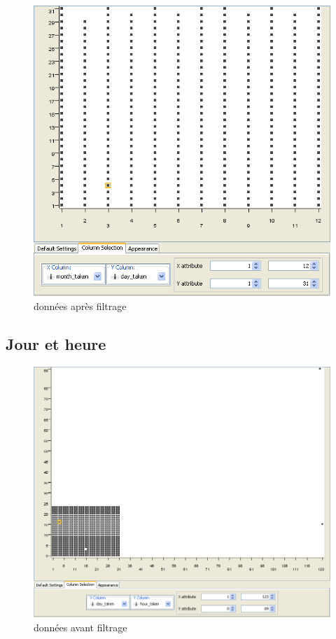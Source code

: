         \begin{figure}[h]
            \centering
            \includegraphics[scale=0.35]{../screenshots/month_day_after.png}
            \caption{données apr\`es filtrage}
            \label{diagram:month_day_after}
        \end{figure}

    \pagebreak
    \subsection{Jour et heure}
        \begin{figure}[h]
            \centering
            \includegraphics[scale=0.27]{../screenshots/day_hour_before.png}
            \caption{données avant filtrage}
            \label{diagram:day_hour_before}
        \end{figure}

